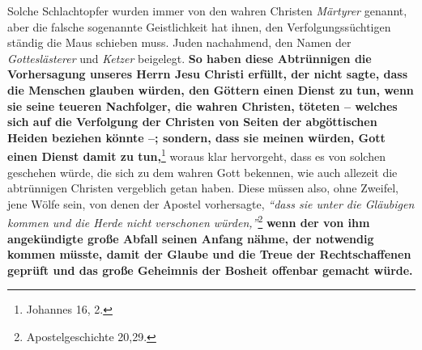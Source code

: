 Solche Schlachtopfer wurden immer von den wahren Christen
\textit{Märtyrer} genannt,
aber die falsche sogenannte Geistlichkeit
hat ihnen, den Verfolgungssüchtigen
ständig die Maus schieben muss.
Juden nachahmend, den Namen der
\textit{Gotteslästerer} und
\textit{Ketzer} beigelegt.  \label{ref:07_16_vervolgung}
\textbf{So haben diese Abtrünnigen die Vorhersagung
unseres Herrn Jesu Christi erfüllt, der nicht sagte, dass die Menschen glauben
würden, den Göttern einen Dienst zu tun, wenn sie seine teueren Nachfolger, die
wahren Christen, töteten
-- welches sich auf die Verfolgung der Christen von Seiten der abgöttischen
Heiden beziehen könnte --; sondern, dass sie meinen
würden, Gott einen Dienst
damit zu tun,}\footnote{Johannes 16, 2.}
woraus klar hervorgeht, dass es von solchen
geschehen würde, die sich zu dem wahren Gott bekennen, wie auch allezeit die
abtrünnigen Christen vergeblich getan haben. Diese müssen also, ohne Zweifel,
jene Wölfe sein, von denen der Apostel vorhersagte,
\textit{"`dass sie unter die
Gläubigen kommen und die Herde nicht verschonen
würden,"'}\footnote{Apostelgeschichte 20,29.}
\textbf{wenn der von ihm angekündigte große Abfall seinen Anfang nähme, der
notwendig kommen müsste, damit der Glaube und die Treue der
Rechtschaffenen
geprüft und das große Geheimnis der Bosheit offenbar gemacht würde.}

\medskip


